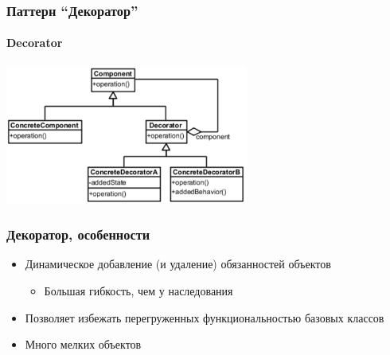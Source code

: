 \documentclass[xetex,mathserif,serif]{beamer}
\begin{document}
	\begin{frame}
		\frametitle{Паттерн ``Декоратор''}
		\framesubtitle{Decorator}
		\begin{center}
			\includegraphics[width=0.6\textwidth]{decorator.png}
		\end{center}
	\end{frame}

	\begin{frame}
		\frametitle{Декоратор, особенности}
		\begin{itemize}
			\item Динамическое добавление (и удаление) обязанностей объектов
			\begin{itemize}
				\item Большая гибкость, чем у наследования
			\end{itemize}
			\item Позволяет избежать перегруженных функциональностью базовых классов
			\item Много мелких объектов
		\end{itemize}
	\end{frame}
\end{document}
